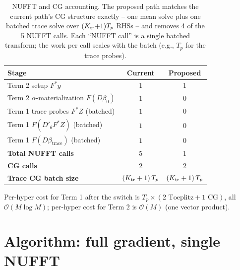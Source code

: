 \documentclass[11pt]{article}
\newcommand{\bigo}{\mathcal{O}}
\begin{document}
\begin{table}[h]
\centering
\begin{tabular}{lcc}
\toprule
Stage & Current & Proposed \\
\midrule
Term 2 setup $F^*y$                                & $1$              & $1$ \\
Term 2 $\alpha$-materialization $F(D\beta_0)$      & $1$              & $0$ \\
Term 1 trace probes $F^*Z$ (batched)               & $1$              & $0$ \\
Term 1 $F(D'_\theta F^*Z)$ (batched)               & $1$              & $0$ \\
Term 1 $F(D\beta_{\text{trace}})$ (batched)        & $1$              & $0$ \\
\midrule
\textbf{Total NUFFT calls}                         & $5$              & $\boxed{1}$ \\
\textbf{CG calls}                                  & $2$              & $2$ \\
\textbf{Trace CG batch size}                       & $(K_{\rm tr}+1)\,T_p$ & $(K_{\rm tr}+1)\,T_p$ \\
\bottomrule
\end{tabular}
\caption{NUFFT and CG accounting. The proposed path matches the current path's CG structure exactly -- one mean solve plus one batched trace solve over $(K_{\rm tr}{+}1)T_p$ RHSs -- and removes 4 of the 5 NUFFT calls. Each ``NUFFT call'' is a single batched transform; the work per call scales with the batch (e.g., $T_p$ for the trace probes).}
\end{table}

Per-hyper cost for Term 1 after the switch is $T_p \times (2\text{ Toeplitz} + 1\text{ CG})$, all $\bigo(M\log M)$; per-hyper cost for Term 2 is $\bigo(M)$ (one vector product).

\section{Algorithm: full gradient, single NUFFT}
\end{document}

